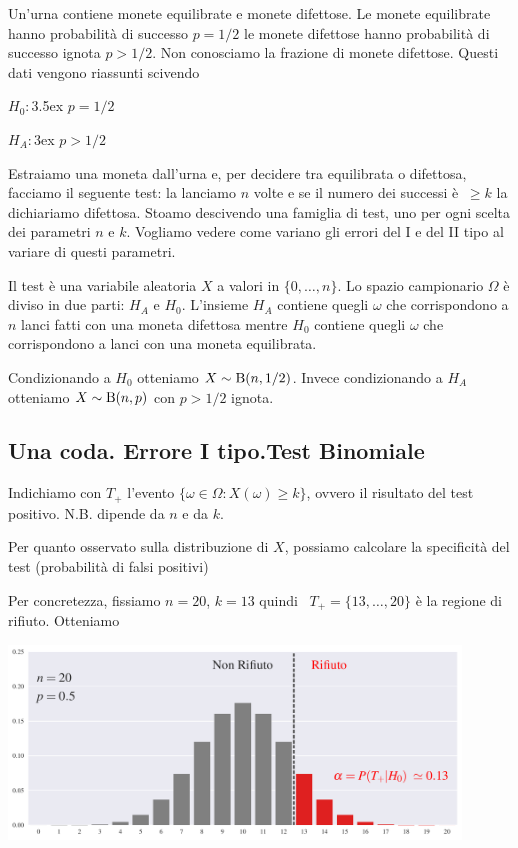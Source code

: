 \documentclass[10pt,openany]{book}
\theoremstyle{mio}
\theoremstyle{liscio}
\begin{document}
Un'urna contiene monete equilibrate e monete difettose. Le monete equilibrate hanno probabilità di successo $p=1/2$ le monete difettose hanno probabilità di successo ignota $p>1/2$. Non conosciamo la frazione di monete difettose. Questi dati vengono riassunti scivendo

$H_0:$\kern3.5ex $p=1/2$

$H_A:$\kern3ex $p>1/2$
 
Estraiamo una moneta dall'urna e, per decidere tra equilibrata o difettosa, facciamo il seguente test: la lanciamo $n$ volte e se il numero dei successi è $\ \ge k$ la dichiariamo difettosa. Stoamo descivendo una famiglia di test, uno per ogni scelta dei parametri $n$ e $k$. Vogliamo vedere come variano gli errori del I e del II tipo al variare di questi parametri. 

Il test è una variabile aleatoria $X$ a valori in $\{0,\dots,n\}$. Lo spazio campionario $\Omega$ è diviso in due parti: $H_A$ e $H_0$.  L'insieme $H_A$ contiene quegli $\omega$ che corrispondono a $n$ lanci fatti con una moneta difettosa mentre $H_0$ contiene quegli $\omega$ che corrispondono a lanci con una moneta equilibrata. 

Condizionando a $H_0$ otteniamo $X\sim {\rm B}(n,1/2)$. Invece condizionando a $H_A$ otteniamo $X\sim {\rm B}(n,p)$ con $p>1/2$ ignota.


\clearpage\subsection{Una coda. Errore I tipo.\hfill Test Binomiale}

Indichiamo con $T_+$ l'evento $\{\omega\in\Omega: X(\omega)\ge k\}$, ovvero il risultato del test positivo. N.B. dipende da $n$ e da $k$.

Per quanto osservato sulla distribuzione di $X$, possiamo calcolare la specificità del test (probabilità di falsi positivi)



Per concretezza, fissiamo $n=20$, $k=13$ quindi {\color{red}\boldmath\ $T_+=\{13,\dots,20\}$} è la regione di rifiuto. Otteniamo %


\hfil\includegraphics[width=0.9\textwidth]{figure/B-test_01.pdf}
\end{document}
